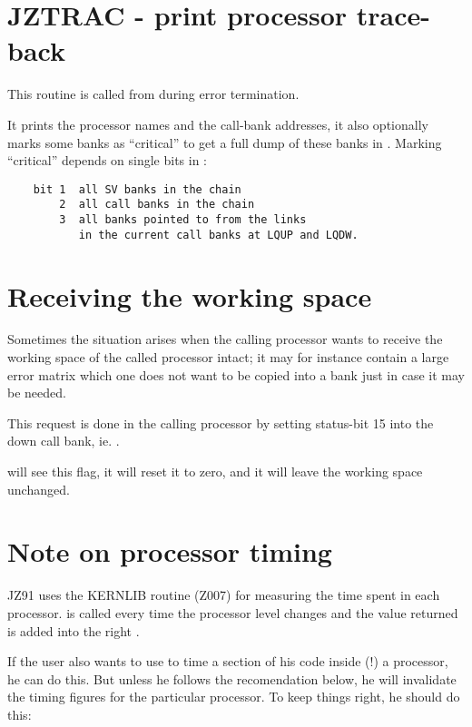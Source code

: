 \newpage
{}
\section{JZTRAC - print processor trace-back}

This routine is called from  during error termination.


It prints the processor names and the call-bank addresses,
it also optionally marks some banks as ``critical''
to get a full dump of these banks in .
Marking ``critical'' depends on single bits in :

\begin{verbatim}
    bit 1  all SV banks in the chain
        2  all call banks in the chain
        3  all banks pointed to from the links
           in the current call banks at LQUP and LQDW.
\end{verbatim} 

\section{Receiving the working space}

Sometimes the situation arises when the calling processor
wants to receive the working space of the called processor
intact;
it may for instance contain a large error matrix
which one does not want to be copied into a bank
just in case it may be needed.

This request is done in the calling processor
by setting status-bit 15 into the down call bank,
ie. .

 will see this flag,
it will reset it to zero,
and it will leave the working space unchanged.

\section{Note on processor timing}

JZ91 uses the KERNLIB routine  (Z007)
for measuring the time spent in each processor.
 is called every time the processor level changes
and the value returned is added into the right .

If the user also wants to use  to time a section
of his code inside (!) a processor,
he can do this.
But unless he follows the recomendation below,
he will invalidate the timing figures for the particular
processor.
To keep things right, he should do this:

